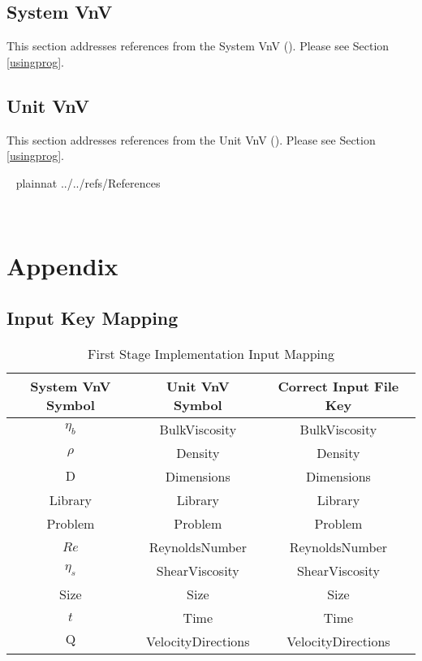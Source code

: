 \documentclass[12pt, titlepage]{article}
\begin{document}
\subsection{System VnV}

This section addresses references from the System VnV (\citet{LBM_SVNV_PM}).
Please see Section \ref{usingprog}.


\subsection{Unit VnV}

This section addresses references from the Unit VnV (\citet{LBM_UVNV_PM}).
Please see Section \ref{usingprog}.

~\newpage
\clearpage
 {plainnat}
 {../../refs/References}

~\newpage
\section{Appendix}

\subsection{Input Key Mapping}
\label{inputkeymap}

\begin{table}[!h]
	\begin{center}
		\begin{tabular}{| c | c | c |}
			\hline
			\textbf{System VnV Symbol} & \textbf{Unit VnV Symbol} & \textbf{Correct Input File Key}\\
			\hline
			$\eta_b$&BulkViscosity & BulkViscosity \\
			\hline
			$\rho$&Density & Density\\
			\hline
			$\mathrm{D}$&Dimensions & Dimensions\\
			\hline
			Library&Library & Library\\
			\hline
			Problem&Problem & Problem\\
			\hline
			$Re$&ReynoldsNumber & ReynoldsNumber\\
			\hline
			$\eta_s$&ShearViscosity & ShearViscosity\\
			\hline
			Size&Size & Size\\
			\hline
			$t$&Time & Time\\
			\hline
			$\mathrm{Q}$&VelocityDirections & VelocityDirections\\
			\hline
		\end{tabular}
		\caption{First Stage Implementation Input Mapping}
		\label{table:InputMapping}
	\end{center}
\end{table} 
\end{document}
